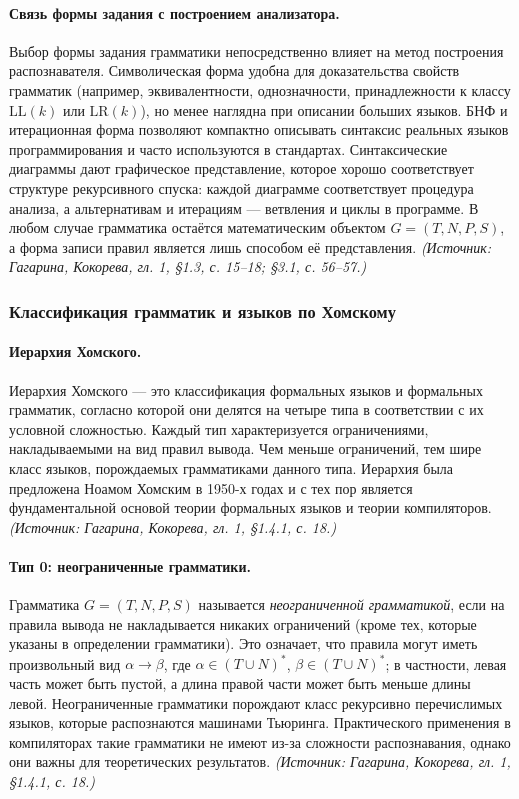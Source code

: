 \documentclass[a4paper,12pt]{article}
\begin{document}
\paragraph{Связь формы задания с построением анализатора.}
Выбор формы задания грамматики непосредственно влияет на метод построения распознавателя. Символическая форма удобна для доказательства свойств грамматик (например, эквивалентности, однозначности, принадлежности к классу \(\mathrm{LL}(k)\) или \(\mathrm{LR}(k)\)), но менее наглядна при описании больших языков. БНФ и итерационная форма позволяют компактно описывать синтаксис реальных языков программирования и часто используются в стандартах. Синтаксические диаграммы дают графическое представление, которое хорошо соответствует структуре рекурсивного спуска: каждой диаграмме соответствует процедура анализа, а альтернативам и итерациям — ветвления и циклы в программе. В любом случае грамматика остаётся математическим объектом \(G=(T,N,P,S)\), а форма записи правил является лишь способом её представления.
\textit{(Источник: Гагарина, Кокорева, гл. 1, §1.3, с. 15--18; §3.1, с. 56--57.)}

\subsubsection{Классификация грамматик и языков по Хомскому}

\paragraph{Иерархия Хомского.}
Иерархия Хомского — это классификация формальных языков и формальных грамматик, согласно которой они делятся на четыре типа в соответствии с их условной сложностью. Каждый тип характеризуется ограничениями, накладываемыми на вид правил вывода. Чем меньше ограничений, тем шире класс языков, порождаемых грамматиками данного типа. Иерархия была предложена Ноамом Хомским в 1950-х годах и с тех пор является фундаментальной основой теории формальных языков и теории компиляторов.
\textit{(Источник: Гагарина, Кокорева, гл. 1, §1.4.1, с. 18.)}

\paragraph{Тип 0: неограниченные грамматики.}
Грамматика \(G=(T,N,P,S)\) называется \emph{неограниченной грамматикой}, если на правила вывода не накладывается никаких ограничений (кроме тех, которые указаны в определении грамматики). Это означает, что правила могут иметь произвольный вид \(\alpha\to\beta\), где \(\alpha\in(T\cup N)^*\), \(\beta\in(T\cup N)^*\); в частности, левая часть может быть пустой, а длина правой части может быть меньше длины левой. Неограниченные грамматики порождают класс рекурсивно перечислимых языков, которые распознаются машинами Тьюринга. Практического применения в компиляторах такие грамматики не имеют из-за сложности распознавания, однако они важны для теоретических результатов.
\textit{(Источник: Гагарина, Кокорева, гл. 1, §1.4.1, с. 18.)}
\end{document}
